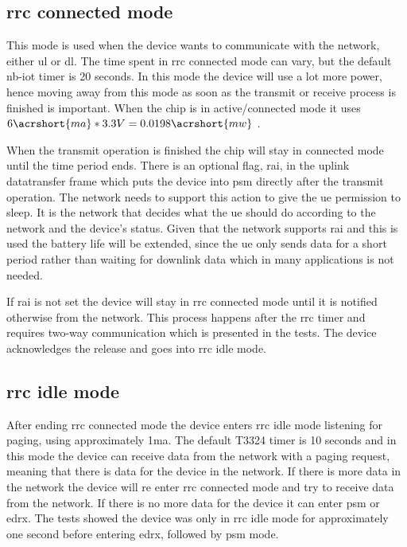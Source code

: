 \documentclass[USenglish]{ifimaster}  %
\begin{document}
\subsection{\acrshort{rrc} connected mode} \label{ssection:rrc}
This mode is used when the device wants to communicate with the network, either \acrshort{ul} or \acrshort{dl}. The time spent in \acrshort{rrc} connected mode can vary, but the default \acrshort{nb-iot} timer is 20 seconds. In this mode the device will use a lot more power, hence moving away from this mode as soon as the transmit or receive process is finished is important. When the chip is in active/connected mode it uses ${6 \acrshort{ma} * 3.3V = 0.0198 \acrshort{mw}}$ \cite{datasheet:ubloxchip}.

When the transmit operation is finished the chip will stay in connected mode until the time period ends. There is an optional flag, \acrfull{rai}, in the uplink datatransfer frame which puts the device into \acrshort{psm} directly after the transmit operation. The network needs to support this action to give the \acrshort{ue} permission to sleep. It is the network that decides what the \acrshort{ue} should do according to the network and the device's status. Given that the network supports \acrshort{rai} and this is used the battery life will be extended, since the \acrshort{ue} only sends data for a short period rather than waiting for downlink data which in many applications is not needed.

If \acrshort{rai} is not set the device will stay in \acrshort{rrc} connected mode until it is notified otherwise from the network. This process happens after the \acrshort{rrc} timer and requires two-way communication which is presented in the tests. The device acknowledges the release and goes into \acrshort{rrc} idle mode.

\subsection{\acrshort{rrc} idle mode}
After ending \acrshort{rrc} connected mode the device enters \acrshort{rrc} idle mode listening for paging, using approximately 1\acrshort{ma}. The default \acrfull{T3324} timer is 10 seconds and in this mode the device can receive data from the network with a paging request, meaning that there is data for the device in the network. If there is more data in the network the device will re enter \acrshort{rrc} connected mode and try to receive data from the network. If there is no more data for the device it can enter \acrshort{psm} or \acrshort{edrx}. The tests showed the device was only in \acrshort{rrc} idle mode for approximately one second before entering \acrshort{edrx}, followed by \acrshort{psm} mode.
\end{document}
